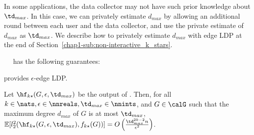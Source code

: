 In some applications, the data collector may not have such prior knowledge about $\td_{max}$. 
In this case, we can 
privately estimate $d_{max}$ by allowing an additional round between each user and the data collector, and use the private estimate of $d_{max}$ as $\td_{max}$. 
We describe how to privately estimate $d_{max}$ with edge LDP at the end of Section~\ref{chap1-sub:non-interactive_k_stars}. 



\smallskip
{}~~ 
has the following guarantees:

\begin{theorem}\label{chap1-thm:k-stars_LDP}
  provides $\epsilon$-edge LDP.
\end{theorem}

\begin{theorem}\label{chap1-thm:k-stars}
  Let
  $\hf_{k\star}(G, \epsilon, \td_{max})$ 
  be the output of 
  . 
  Then, 
  for all 
  $k \in \nats,\epsilon \in \nnreals,\td_{max} \in \nnints$, 
  and $G \in \calG$
  such that the maximum degree $d_{max}$ of $G$ 
  is at most 
  $\td_{max}$, 
  $\mathbb{E}[l_2^2(\hf_{k\star}(G, \epsilon, \td_{max}), f_{k\star}(G))] = 
  O\left( \frac{\td_{max}^{2k-2}n}{\epsilon^2} \right)$. 
\end{theorem}

